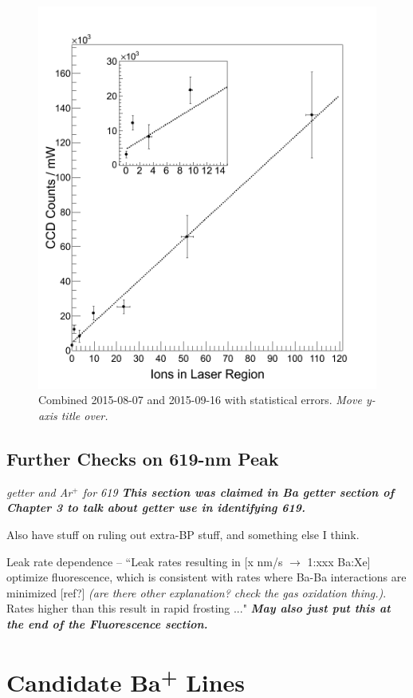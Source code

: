 \begin{figure} %
        \centering
                \includegraphics[width=.7\textwidth]{figures/fitgrouped_20150807_20150916_inset.png}
                \caption{Combined 2015-08-07 and 2015-09-16 with statistical errors.  \emph{\color{gray}Move y-axis title over.}}
\label{fig:lin}
\end{figure}

\subsection{Further Checks on 619-nm Peak}

\emph{\color{gray}getter and Ar$^{+}$ for 619 \textbf{\color{gray}This section was claimed in Ba getter section of Chapter 3 to talk about getter use in identifying 619.}}

Also have stuff on ruling out extra-BP stuff, and something else I think.

Leak rate dependence -- ``Leak rates resulting in [x nm/s $\rightarrow$ 1:xxx Ba:Xe] optimize fluorescence, which is consistent with rates where Ba-Ba interactions are minimized [ref?] \emph{\color{gray}(are there other explanation?  check the gas oxidation thing.)}.  Rates higher than this result in rapid frosting ..." \emph{\textbf{\color{gray}May also just put this at the end of the  Fluorescence section.}}

\section{Candidate Ba\textsuperscript{+} Lines}
\label{sec:BaPlus}